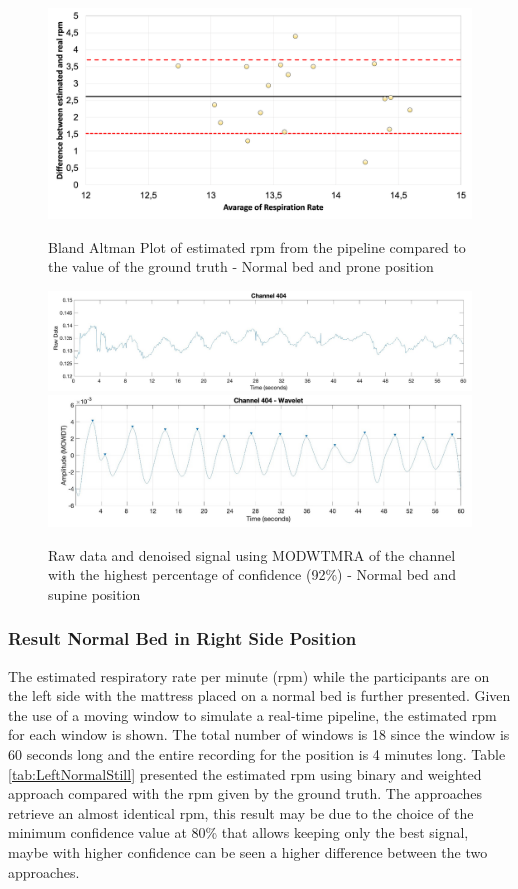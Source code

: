 \begin{figure}[p]
  \centering
  \includegraphics[width=\textwidth]{img/balnd3.png}

  \caption{Bland Altman Plot of estimated rpm from the pipeline compared to the value of the ground truth - Normal bed and prone position}
  \label{fig:baln2}
  \vspace{1.5cm}
  \includegraphics[width=\textwidth]{img/404.jpg}
  \includegraphics[width=\textwidth]{img/404_wave.jpg}
\caption{Raw data and denoised signal using MODWTMRA of the channel with the highest percentage of confidence (92\%) - Normal bed and supine position}
  \label{fig:rec}
\end{figure}

\clearpage
\subsubsection{Result Normal Bed in Right Side Position}   \label{cap:ResultNormalBed4}

The estimated respiratory rate per minute (rpm) while the participants are on the left side with the mattress placed on a normal bed is further presented. Given the use of a moving window to simulate a real-time pipeline, the estimated rpm for each window is shown. 
The total number of windows is 18 since the window is 60 seconds long and the entire recording for the position is 4 minutes long. Table \ref{tab:LeftNormalStill} presented the estimated rpm using binary and weighted approach compared with the rpm given by the ground truth. The approaches retrieve an almost identical rpm, this result may be due to the choice of the minimum confidence value at 80\% that allows keeping only the best signal, maybe with higher confidence can be seen a higher difference between the two approaches. 

